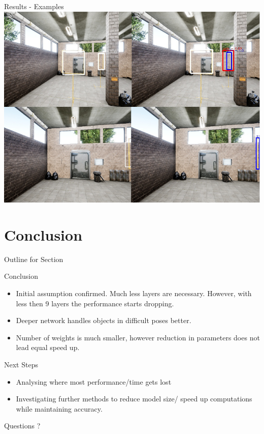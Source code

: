 \documentclass{beamer}
\begin{document}
\begin{darkframes}
    \begin{frame}{Results - Examples}
    	\includegraphics[width=\textwidth]{fig/examples}
	\end{frame}

    
    \section{Conclusion}
            \begin{frame}{Outline for Section \thesection}
    \tableofcontents[currentsection]
\end{frame}
    \begin{frame}{Conclusion}

    \begin{itemize}
    	\item Initial assumption confirmed. Much less layers are necessary. However, with less then 9 layers the performance starts dropping.
    	\item Deeper network handles objects in difficult poses better.
    	\item Number of weights is much smaller, however reduction in parameters does not lead equal speed up.
    \end{itemize}
    \end{frame}

    \begin{frame}{Next Steps}
    	\begin{itemize}
    		\item Analysing where most performance/time gets lost
    		\item Investigating further methods to reduce model size/ speed up computations while maintaining accuracy.
    	\end{itemize}
    \end{frame}
    

    \begin{frame}{Questions}
    \centering
\huge ?
    	\end{frame}
    
    
  \end{darkframes}
\end{document}
